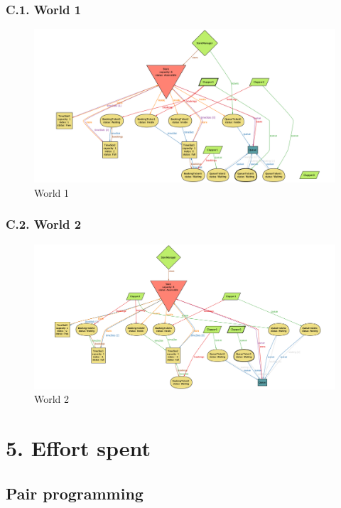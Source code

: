 \subsection{C.1. World 1}

\begin{figure}[H]
\centering
\includegraphics{alloy/world_1}
\caption{World 1}
\end{figure}

\subsection{C.2. World 2}

\begin{figure}[H]
\centering
\includegraphics{alloy/world_2}
\caption{World 2}
\end{figure}

\chapter{5. Effort spent}

\section*{Pair programming}


